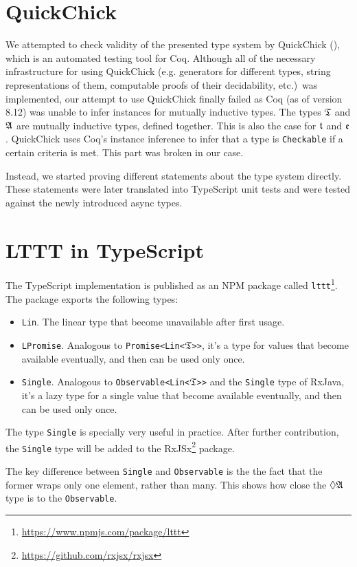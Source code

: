 \section{QuickChick}

We attempted to check validity of the presented type system by QuickChick (\cite{DBLP:conf/itp/Paraskevopoulou15}), which is an automated testing tool for Coq. Although all of the necessary infrastructure for using QuickChick (e.g. generators for different types, string representations of them, computable proofs of their decidability, etc.)~was implemented, our attempt to use QuickChick finally failed as Coq (as of version 8.12) was unable to infer instances for mutually inductive types. The types $\mathfrak{T}$ and $\mathfrak{A}$ are mutually inductive types, defined together. This is also the case for $\mathfrak{t}$ and $\mathfrak{e}$. QuickChick uses Coq's instance inference to infer that a type is \texttt{Checkable} if a certain criteria is met. This part was broken in our case.

Instead, we started proving different statements about the type system directly. These statements were later translated into TypeScript unit tests and were tested against the newly introduced async types.

\section{LTTT in TypeScript}

The TypeScript implementation is published as an NPM package called \texttt{lttt}\footnote{\url{https://www.npmjs.com/package/lttt}}. The package exports the following types:
\begin{itemize}
    \item \texttt{Lin}. The linear type that become unavailable after first usage.
    \item \texttt{LPromise}. Analogous to \texttt{Promise<Lin<}$\mathfrak{T}$\texttt{>{}>}, it's a type for values that become available eventually, and then can be used only once.
    \item \texttt{Single}. Analogous to \texttt{Observable<Lin<}$\mathfrak{T}$\texttt{>{}>} and the \texttt{Single} type of RxJava, it's a lazy type for a single value that become available eventually, and then can be used only once.
\end{itemize}

The type \texttt{Single} is specially very useful in practice. After further contribution, the \texttt{Single} type will be added to the RxJSx\footnote{\url{https://github.com/rxjsx/rxjsx}} package.

The key difference between \texttt{Single} and \texttt{Observable} is the the fact that the former wraps only one element, rather than many. This shows how close the $\lozenge\mathfrak{A}$ type is to the \texttt{Observable}.